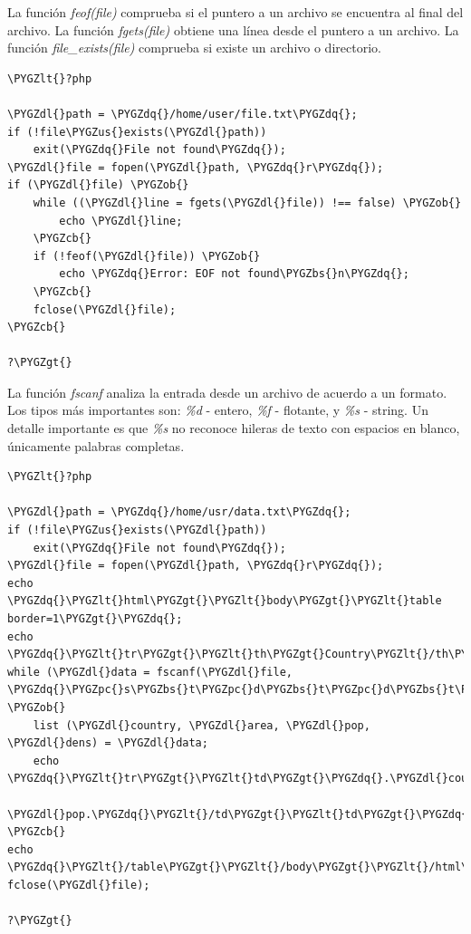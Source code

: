 \documentclass[a5paper,10pt,spanish]{sphinxmanual}
\def\PYGZbs{\char`\\}
\def\PYGZus{\char`\_}
\def\PYGZob{\char`\{}
\def\PYGZcb{\char`\}}
\def\PYGZlt{\char`\<}
\def\PYGZgt{\char`\>}
\def\PYGZpc{\char`\%}
\def\PYGZdl{\char`\$}
\def\PYGZdq{\char`\"}
\begin{document}
La función \emph{feof(file)} comprueba si el puntero a un archivo se
encuentra al final del archivo. La función \emph{fgets(file)} obtiene una
línea desde el puntero a un archivo. La función \emph{file\_exists(file)}
comprueba si existe un archivo o directorio.

\begin{Verbatim}[commandchars=\\\{\}]
\PYGZlt{}?php

\PYGZdl{}path = \PYGZdq{}/home/user/file.txt\PYGZdq{};
if (!file\PYGZus{}exists(\PYGZdl{}path))
    exit(\PYGZdq{}File not found\PYGZdq{});
\PYGZdl{}file = fopen(\PYGZdl{}path, \PYGZdq{}r\PYGZdq{});
if (\PYGZdl{}file) \PYGZob{}
    while ((\PYGZdl{}line = fgets(\PYGZdl{}file)) !== false) \PYGZob{}
        echo \PYGZdl{}line;
    \PYGZcb{}
    if (!feof(\PYGZdl{}file)) \PYGZob{}
        echo \PYGZdq{}Error: EOF not found\PYGZbs{}n\PYGZdq{};
    \PYGZcb{}
    fclose(\PYGZdl{}file);
\PYGZcb{}

?\PYGZgt{}
\end{Verbatim}

La función \emph{fscanf} analiza la entrada desde un archivo de acuerdo a un
formato. Los tipos más importantes son: \emph{\%d} - entero, \emph{\%f} - flotante,
y \emph{\%s} - string. Un detalle importante es que \emph{\%s} no reconoce hileras
de texto con espacios en blanco, únicamente palabras completas.

\begin{Verbatim}[commandchars=\\\{\}]
\PYGZlt{}?php

\PYGZdl{}path = \PYGZdq{}/home/usr/data.txt\PYGZdq{};
if (!file\PYGZus{}exists(\PYGZdl{}path))
    exit(\PYGZdq{}File not found\PYGZdq{});
\PYGZdl{}file = fopen(\PYGZdl{}path, \PYGZdq{}r\PYGZdq{});
echo \PYGZdq{}\PYGZlt{}html\PYGZgt{}\PYGZlt{}body\PYGZgt{}\PYGZlt{}table border=1\PYGZgt{}\PYGZdq{};
echo \PYGZdq{}\PYGZlt{}tr\PYGZgt{}\PYGZlt{}th\PYGZgt{}Country\PYGZlt{}/th\PYGZgt{}\PYGZlt{}th\PYGZgt{}Area\PYGZlt{}/th\PYGZgt{}\PYGZlt{}th\PYGZgt{}Population\PYGZlt{}/th\PYGZgt{}\PYGZlt{}th\PYGZgt{}Density\PYGZlt{}/th\PYGZgt{}\PYGZlt{}/tr\PYGZgt{}\PYGZdq{};
while (\PYGZdl{}data = fscanf(\PYGZdl{}file, \PYGZdq{}\PYGZpc{}s\PYGZbs{}t\PYGZpc{}d\PYGZbs{}t\PYGZpc{}d\PYGZbs{}t\PYGZpc{}f\PYGZbs{}n\PYGZdq{})) \PYGZob{}
    list (\PYGZdl{}country, \PYGZdl{}area, \PYGZdl{}pop, \PYGZdl{}dens) = \PYGZdl{}data;
    echo \PYGZdq{}\PYGZlt{}tr\PYGZgt{}\PYGZlt{}td\PYGZgt{}\PYGZdq{}.\PYGZdl{}country.\PYGZdq{}\PYGZlt{}/td\PYGZgt{}\PYGZlt{}td\PYGZgt{}\PYGZdq{}.\PYGZdl{}area.\PYGZdq{}\PYGZlt{}/td\PYGZgt{}\PYGZlt{}td\PYGZgt{}\PYGZdq{}.
         \PYGZdl{}pop.\PYGZdq{}\PYGZlt{}/td\PYGZgt{}\PYGZlt{}td\PYGZgt{}\PYGZdq{}.\PYGZdl{}dens.\PYGZdq{}\PYGZlt{}/td\PYGZgt{}\PYGZlt{}/tr\PYGZgt{}\PYGZdq{};
\PYGZcb{}
echo \PYGZdq{}\PYGZlt{}/table\PYGZgt{}\PYGZlt{}/body\PYGZgt{}\PYGZlt{}/html\PYGZgt{}\PYGZdq{};
fclose(\PYGZdl{}file);

?\PYGZgt{}
\end{Verbatim}
\end{document}
